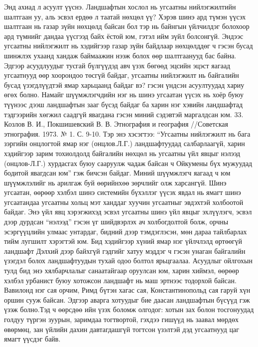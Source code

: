 Энд ахиад л асуулт үүснэ. Ландшафтын хослол нь угсаатны нийлэгжилтийн шалтгаан уу, аль эсвэл ердөө л таатай нөхцөл үү? Хэрэв шинэ ард түмэн үүсэх шалтгаан нь газар зүйн нөхцөлд байсан бол тэр нь байнгын үйлчилдэг болохоор ард түмнийг дандаа үүсгээд байх ёстой юм, гэтэл ийм зүйл болсонгүй. Эндээс угсаатны нийлэгжилт нь хэдийгээр газар зүйн байдлаар нөхцөлддөг ч гэсэн бусад шинжлэх ухаанд хандаж баймаажин нээж болох өөр шалтгаанууд бас байна. Эдгээр асуудлуудыг тусгай бүлгүүдэд авч үзэх бөгөөд эцсийн эцэст яагаад угсаатнууд өөр хоорондоо төсгүй байдаг, угсаатны нийлэгжилт нь байгалийн бусад үзэгдлүүдтэй ямар харьцаанд байдаг вэ? гэсэн үндсэн асуултуудад хариу өгөх болно.
Намайг шүүмжлэгчдийн нэг нь шинэ угсаатан үүсэх нь хоёр буюу түүнээс дээш ландшафтын зааг бүсэд байдаг ба харин нэг хэвийн ландшафтад тэдгээрийн хөгжил саадгүй явагдана гэсэн миний сэдэвтэй маргалдсан юм. 33. Козлов В. И., Покшишевский В. В. Этнография и география //Советская этнография. 1973. № 1. С. 9-10.
Тэр энэ хэсэгтээ: “Угсаатны нийлэгжилт нь бага зэргийн онцлогтой ямар нэг (онцлов.Л.Г.) ландшафтуудад салбарлаагүй, харин хэдийгээр зарим тохиолдолд байгалийн нөхцөл нь угсаатны үйл явцыг нэлээд (онцлов-Л.Г.) хурдасгах буюу сааруулж чадаж байсан ч Ойкумены бүх мужуудад бодитой явагдсан юм” гэж бичсэн байдаг. Миний шүүмжлэгч яагаад ч юм шүүмжлэлийг нь арилгаж буй өөрийнхөө зөрчлийг олж харсангүй. Шинэ угсаатан, өөрөөр хэлбэл шинэ системийн бүхэллэг үүсэх явдал нь ямагт шинэ угсаатандаа угсаатны хольц мэт ханддаг хуучин угсаатныг эвдэхтэй холбоотой байдаг. Энэ үйл явц хэрэгжихэд эсвэл угсаатны шинэ үйл явцыг эхлүүлэгч, эсвэл дээр дурдсан “нэлээд” гэсэн үг шийдвэрлэх ач холбогдолтой болж, орчны эсэргүүцлийн улмаас унтардаг, бидний дээр тэмдэглэсэн, мөн дараа тайлбарлах тийм лугшилт хэрэгтэй юм.
Бид хэдийгээр хүний ямар нэг үйлчлэлд өртөөгүй ландшафт Дэлхий дээр байхгүй гэдгийг хатуу мэддэг ч гэсэн унаган байгалийн үзэгдэл болох ландшафтуудын тухай одоо болтол ярьцгаалаа. Асуудлыг ойлгохын тулд бид энэ хялбарчлалыг санаатайгаар оруулсан юм, харин хиймэл, өөрөөр хэлбэл урбанист буюу хотожсон ландшафт нь маш эртнээс тодорхой байсан. Вавилонд нэг сая орчим, Римд бүтэн хагас сая, Константинопольд сая гаруй хүн оршин сууж байсан. Эдгээр аварга хотуудыг бие даасан ландшафтын бүсүүд гэж үзэж болно.Тэд ч өөрсдөө ийн үзэх боломж олгодог: хотын зах болон тосгонуудад голдуу түргэн зуурын, заримдаа тогтвортой, гэхдээ гишүүд нь заавал мөрдөх өвөрмөц, зан үйлийн дахин давтагдашгүй тогтсон үзэлтэй дэд угсаатнууд цаг ямагт үүсдэг байв.
